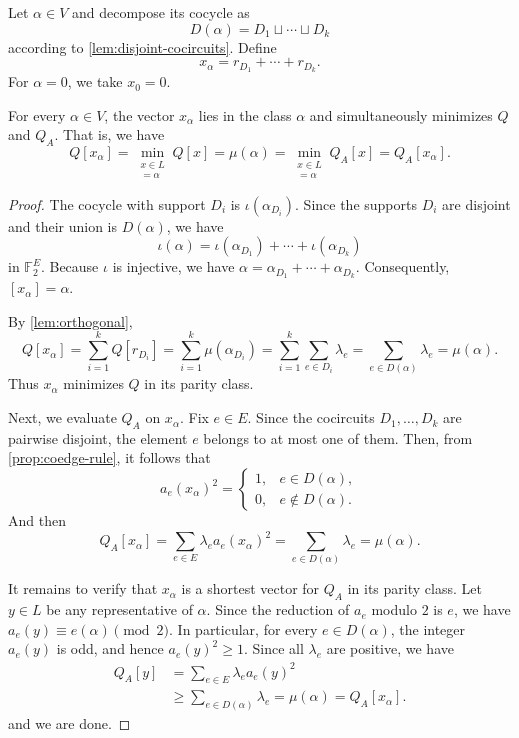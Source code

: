 \documentclass[11pt,letterpaper]{amsart}
\begin{document}
Let $\alpha\in V$ and decompose its cocycle as
\[
  D(\alpha)=D_1\sqcup\cdots\sqcup D_k
\]
according to \cref{lem:disjoint-cocircuits}.  Define
\begin{equation*}
  x_\alpha=r_{D_1}+\cdots+r_{D_k}.
\end{equation*}
For $\alpha=0$, we take $x_0=0$.

\begin{proposition}\label{prop:common-representative}
For every $\alpha\in V$, the vector $x_\alpha$ lies in the class $\alpha$ and simultaneously minimizes $Q$ and
$Q_A$. That is, we have
\[
    Q[x_\alpha]
    =
    \min_{\substack{x\in L\\ [x]=\alpha}}Q[x]
    =
    \mu(\alpha)
    =
    \min_{\substack{x\in L\\ [x]=\alpha}}Q_A[x]
    =
    Q_A[x_\alpha].
\]
\end{proposition}
\begin{proof}
    The cocycle with support $D_i$ is $\iota(\alpha_{D_i})$. Since the
supports $D_i$ are disjoint and their union is $D(\alpha)$, we have
\[
    \iota(\alpha)
    =
    \iota(\alpha_{D_1})
    +\cdots+
    \iota(\alpha_{D_k})
\]
in $\mathbb F_2^E$. Because $\iota$ is injective, we have $\alpha = \alpha_{D_1}+\cdots+\alpha_{D_k}.$ Consequently, $[x_\alpha]=\alpha$.

By \cref{lem:orthogonal},
\[
    Q[x_\alpha] =
    \sum_{i=1}^k Q[r_{D_i}] =
    \sum_{i=1}^k \mu(\alpha_{D_i}) =
    \sum_{i=1}^k\sum_{e\in D_i}\lambda_e =
    \sum_{e\in D(\alpha)}\lambda_e =
    \mu(\alpha).
\]
Thus $x_\alpha$ minimizes $Q$ in its parity class.

Next, we evaluate $Q_A$ on $x_\alpha$. Fix $e\in E$. Since the
cocircuits $D_1,\ldots,D_k$ are pairwise disjoint, the element $e$
belongs to at most one of them. Then, from \cref{prop:coedge-rule},
it follows that
\[
    a_e(x_\alpha)^2
    =
    \begin{cases}
        1, & e\in D(\alpha),\\
        0, & e\notin D(\alpha).
    \end{cases}
\]
And then
\[
    Q_A[x_\alpha]
    =
    \sum_{e\in E}\lambda_e a_e(x_\alpha)^2
    =
    \sum_{e\in D(\alpha)}\lambda_e
    =
    \mu(\alpha).
\]

It remains to verify that $x_\alpha$ is a shortest vector for $Q_A$ in its parity class. Let $y\in L$ be any representative of $\alpha$. Since the reduction of $a_e$ modulo $2$ is $e$, we have $a_e(y)\equiv e(\alpha)\pmod 2.$ In particular, for every $e\in D(\alpha)$, the integer $a_e(y)$ is
odd, and hence $a_e(y)^2\geq1.$ Since all $\lambda_e$ are positive, we have
\begin{align*}
    Q_A[y]
    &=
    \sum_{e\in E}\lambda_e a_e(y)^2 \\
    &\geq
    \sum_{e\in D(\alpha)}\lambda_e =
    \mu(\alpha) =
    Q_A[x_\alpha].
\end{align*}
and we are done.
\end{proof}
\end{document}
